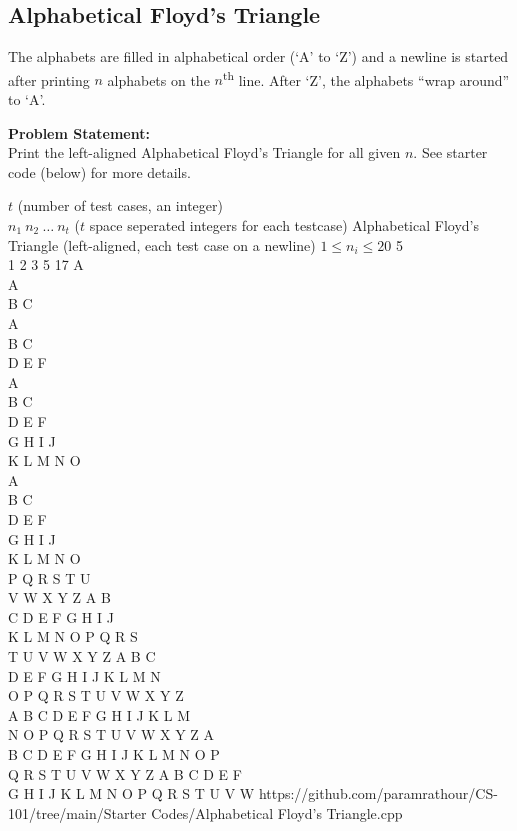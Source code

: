 \documentclass[../../Problems]{subfiles}
\begin{document}
\subsection{Alphabetical Floyd's Triangle}{\label{pp:alphabeticalfloydstriangle}}
The alphabets are filled in alphabetical order (`A' to `Z') and a newline is started after printing $n$ alphabets on the $n$\textsuperscript{th} line. After `Z', the alphabets ``wrap around'' to `A'.

\textbf{Problem Statement:}\\
Print the left-aligned Alphabetical Floyd's Triangle for all given $n$. See starter code (below) for more details.
\begin{testcases}
	{$t$ \hfill(number of test cases, an integer)\\$n_1\ n_2\ \ldots\ n_t$ \hfill($t$ space seperated integers for each testcase)}
	{Alphabetical Floyd's Triangle \hfill(left-aligned, each test case on a newline)}
	{$1 \leq n_i \leq 20$}
	{5\\1 2 3 5 17}
	{A\\[1em]A\\B C\\[1em]A\\B C\\D E F\\[1em]A\\B C\\D E F\\G H I J\\K L M N O\\[1em]A\\B C\\D E F\\G H I J\\K L M N O\\P Q R S T U\\V W X Y Z A B\\C D E F G H I J\\K L M N O P Q R S\\T U V W X Y Z A B C\\D E F G H I J K L M N\\O P Q R S T U V W X Y Z\\A B C D E F G H I J K L M\\N O P Q R S T U V W X Y Z A\\B C D E F G H I J K L M N O P\\Q R S T U V W X Y Z A B C D E F\\G H I J K L M N O P Q R S T U V W}
	{https://github.com/paramrathour/CS-101/tree/main/Starter Codes/Alphabetical Floyd's Triangle.cpp}
\end{testcases}
\end{document}

